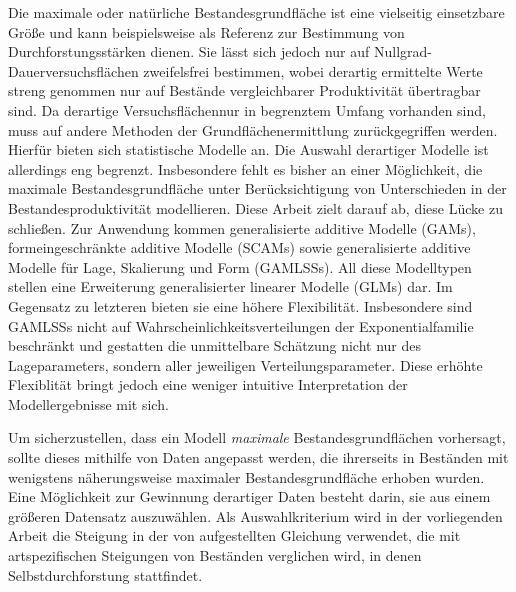 {
  \newcommand{\mysectiontitle}{Zusammenfassung} %
  \markboth{\mysectiontitle{}}{} %

  \pagestyle{zusammenfassung}

  Die maximale oder natürliche Bestandesgrundfläche ist eine vielseitig einsetzbare Größe und kann beispielsweise als Referenz zur Bestimmung von Durchforstungsstärken dienen.  Sie lässt sich jedoch nur auf Nullgrad-Dauerversuchsflächen zweifelsfrei bestimmen, wobei derartig ermittelte Werte streng genommen nur auf Bestände vergleichbarer Produktivität übertragbar sind.  Da derartige Versuchsflächennur in begrenztem Umfang vorhanden sind, muss auf andere Methoden der Grundflächenermittlung zurückgegriffen werden.  Hierfür bieten sich statistische Modelle an.  Die Auswahl derartiger Modelle ist allerdings eng begrenzt. Insbesondere fehlt es bisher an einer Möglichkeit, die maximale Bestandesgrundfläche unter Berücksichtigung von Unterschieden in der Bestandesproduktivität modellieren.  Diese Arbeit zielt darauf ab, diese Lücke zu schließen.  Zur Anwendung kommen generalisierte additive Modelle (GAMs), formeingeschränkte additive Modelle (SCAMs) sowie generalisierte additive Modelle für Lage, Skalierung und Form (GAMLSSs).  All diese Modelltypen stellen eine Erweiterung generalisierter linearer Modelle (GLMs) dar.  Im Gegensatz zu letzteren bieten sie eine höhere Flexibilität.  Insbesondere sind GAMLSSs nicht auf Wahrscheinlichkeitsverteilungen der Exponentialfamilie beschränkt und gestatten die unmittelbare Schätzung nicht nur des Lageparameters, sondern aller jeweiligen Verteilungsparameter.  Diese erhöhte Flexiblität bringt jedoch eine weniger intuitive Interpretation der Modellergebnisse mit sich.
  
  Um sicherzustellen, dass ein Modell \emph{maximale} Bestandesgrundflächen vorhersagt, sollte dieses mithilfe von Daten angepasst werden, die ihrerseits in Beständen mit wenigstens näherungsweise maximaler Bestandesgrundfläche erhoben wurden.  Eine Möglichkeit zur Gewinnung derartiger Daten besteht darin, sie aus einem größeren Datensatz auszuwählen.  Als Auswahlkriterium wird in der vorliegenden Arbeit die Steigung in der von \textcite{Reineke1933} aufgestellten Gleichung verwendet, die mit artspezifischen Steigungen von Beständen verglichen wird, in denen Selbstdurchforstung stattfindet.
  
}
